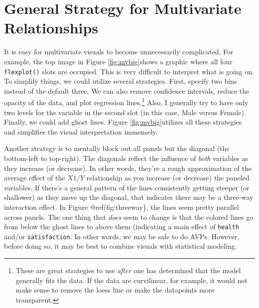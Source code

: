 \documentclass[,]{book}
\let\rmarkdownfootnote\footnote%
\def\footnote{\protect\rmarkdownfootnote}
\begin{document}
\section*{General Strategy for Multivariate
Relationships}\label{general-strategy-for-multivariate-relationships}

It is easy for multivariate visuals to become unnecessarily complicated.
For example, the top image in Figure \ref{fig:mvbig}shows a graphic
where all four \texttt{flexplot()} slots are occupied. This is very
difficult to interpret what is going on. To simplify things, we could
utilize several strategies. First, specify two bins instead of the
default three. We can also remove confidence intervals, reduce the
opacity of the data, and plot regression lines.\footnote{These are great
  strategies to use \emph{after} one has determined that the model
  generally fits the data. If the data are curvilinear, for example, it
  would not make sense to remove the loess line or make the datapoints
  more transparent.} Also, I generally try to have only two levels for
the variable in the second slot (in this case, Male versus Female).
Finally, we could add ghost lines. Figure \ref{fig:mvbig}utilizes all
these strategies and simplifies the visual interpretation immensely.

Another strategy is to mentally block out all panels but the diagonal
(the bottom-left to top-right). The diagonals reflect the influence of
\emph{both} variables as they increase (or decrease). In other words,
they're a rough approximation of the average effect of the \(X1/Y\)
relationship as you increase (or decrease) the paneled variables. If
there's a general pattern of the lines consistently getting steeper (or
shallower) as they move up the diagonal, that indicates there may be a
three-way interaction effect. In Figure @ref(fig:threeway\}, the lines
seem pretty parallel across panels. The one thing that \emph{does} seem
to change is that the colored lines go from below the ghost lines to
above them (indicating a main effect of \texttt{health} and/or
\texttt{satisfaction}. In other words, we may be safe to do AVPs.
However, before doing so, it may be best to combine visuals with
statistical modeling.
\end{document}
